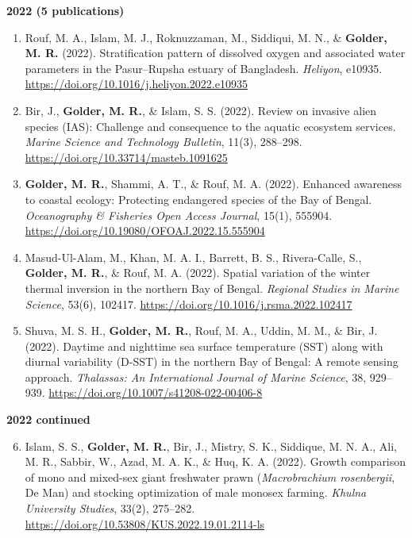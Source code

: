 \documentclass[11pt,a4paper,sans]{moderncv}
\begin{document}
\textbf{2022 (5 publications)}
\begin{enumerate}
  \item Rouf, M. A., Islam, M. J., Roknuzzaman, M., Siddiqui, M. N., \& \textbf{Golder, M. R.} (2022). Stratification pattern of dissolved oxygen and associated water parameters in the Pasur–Rupsha estuary of Bangladesh. \textit{Heliyon}, e10935. \url{https://doi.org/10.1016/j.heliyon.2022.e10935}

  \item Bir, J., \textbf{Golder, M. R.}, \& Islam, S. S. (2022). Review on invasive alien species (IAS): Challenge and consequence to the aquatic ecosystem services. \textit{Marine Science and Technology Bulletin}, 11(3), 288–298. \url{https://doi.org/10.33714/masteb.1091625}

  \item \textbf{Golder, M. R.}, Shammi, A. T., \& Rouf, M. A. (2022). Enhanced awareness to coastal ecology: Protecting endangered species of the Bay of Bengal. \textit{Oceanography \& Fisheries Open Access Journal}, 15(1), 555904. \url{https://doi.org/10.19080/OFOAJ.2022.15.555904}

  \item Masud-Ul-Alam, M., Khan, M. A. I., Barrett, B. S., Rivera-Calle, S., \textbf{Golder, M. R.}, \& Rouf, M. A. (2022). Spatial variation of the winter thermal inversion in the northern Bay of Bengal. \textit{Regional Studies in Marine Science}, 53(6), 102417. \url{https://doi.org/10.1016/j.rsma.2022.102417}

  \item Shuva, M. S. H., \textbf{Golder, M. R.}, Rouf, M. A., Uddin, M. M., \& Bir, J. (2022). Daytime and nighttime sea surface temperature (SST) along with diurnal variability (D-SST) in the northern Bay of Bengal: A remote sensing approach. \textit{Thalassas: An International Journal of Marine Science}, 38, 929–939. \url{https://doi.org/10.1007/s41208-022-00406-8}
\end{enumerate}

\textbf{2022 continued}
\begin{enumerate}\setcounter{enumi}{5}
  \item Islam, S. S., \textbf{Golder, M. R.}, Bir, J., Mistry, S. K., Siddique, M. N. A., Ali, M. R., Sabbir, W., Azad, M. A. K., \& Huq, K. A. (2022). Growth comparison of mono and mixed-sex giant freshwater prawn (\textit{Macrobrachium rosenbergii}, De Man) and stocking optimization of male monosex farming. \textit{Khulna University Studies}, 33(2), 275–282. \url{https://doi.org/10.53808/KUS.2022.19.01.2114-ls}
\end{enumerate}
\end{document}
